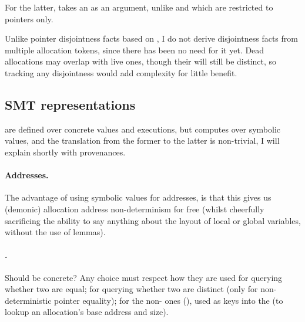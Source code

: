For the latter,  takes an  as an argument,
unlike  and  which are restricted to pointers only.

Unlike pointer disjointness facts based on , I do
not derive  disjointness facts from
multiple allocation tokens, since there has been no need for it
yet.\label{sn:ptr-eq-annotation} Dead allocations may overlap
with live ones, though their  will still be distinct, so
tracking any disjointness would add complexity for little benefit.

\subsection{SMT representations}\label{subsec:smt-rep}

 are defined over concrete values and executions, but
 computes over symbolic values, and the translation from the former to
the latter is non-trivial, I will explain shortly with 
provenances.

\paragraph{Addresses.}%
The advantage of using symbolic values for addresses, is that this gives us
(demonic) allocation address non-determinism for free (whilst cheerfully
sacrificing the ability to say anything about the layout of local or global
variables, without the use of lemmas).

\paragraph{.}%
Should  be concrete? Any choice must respect how they are used
\textemdash{} for querying whether two are equal; for querying whether two are
distinct (only for non-deterministic pointer equality); for the
non- ones (), used as keys into the
 (to lookup an allocation's base address and size).

